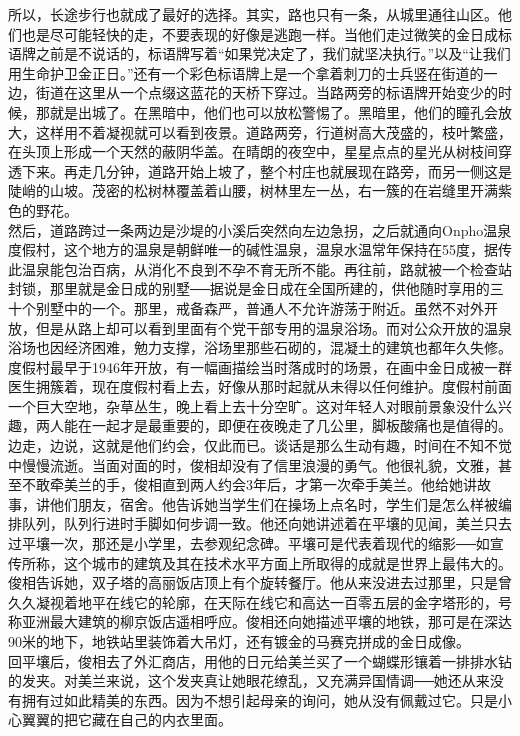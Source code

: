 所以，长途步行也就成了最好的选择。其实，路也只有一条，从城里通往山区。他们也是尽可能轻快的走，不要表现的好像是逃跑一样。当他们走过微笑的金日成标语牌之前是不说话的，标语牌写着“如果党决定了，我们就坚决执行。”以及“让我们用生命护卫金正日。”还有一个彩色标语牌上是一个拿着刺刀的士兵竖在街道的一边，街道在这里从一个点缀这蓝花的天桥下穿过。当路两旁的标语牌开始变少的时候，那就是出城了。在黑暗中，他们也可以放松警惕了。黑暗里，他们的瞳孔会放大，这样用不着凝视就可以看到夜景。道路两旁，行道树高大茂盛的，枝叶繁盛，在头顶上形成一个天然的蔽阴华盖。在晴朗的夜空中，星星点点的星光从树枝间穿透下来。再走几分钟，道路开始上坡了，整个村庄也就展现在路旁，而另一侧这是陡峭的山坡。茂密的松树林覆盖着山腰，树林里左一丛，右一簇的在岩缝里开满紫色的野花。\\

然后，道路跨过一条两边是沙堤的小溪后突然向左边急拐，之后就通向Onpho温泉度假村，这个地方的温泉是朝鲜唯一的碱性温泉，温泉水温常年保持在55度，据传此温泉能包治百病，从消化不良到不孕不育无所不能。再往前，路就被一个检查站封锁，那里就是金日成的别墅──据说是金日成在全国所建的，供他随时享用的三十个别墅中的一个。那里，戒备森严，普通人不允许游荡于附近。虽然不对外开放，但是从路上却可以看到里面有个党干部专用的温泉浴场。而对公众开放的温泉浴场也因经济困难，勉力支撑，浴场里那些石砌的，混凝土的建筑也都年久失修。度假村最早于1946年开放，有一幅画描绘当时落成时的场景，在画中金日成被一群医生拥簇着，现在度假村看上去，好像从那时起就从未得以任何维护。度假村前面一个巨大空地，杂草丛生，晚上看上去十分空旷。这对年轻人对眼前景象没什么兴趣，两人能在一起才是最重要的，即便在夜晚走了几公里，脚板酸痛也是值得的。\\

边走，边说，这就是他们约会，仅此而已。谈话是那么生动有趣，时间在不知不觉中慢慢流逝。当面对面的时，俊相却没有了信里浪漫的勇气。他很礼貌，文雅，甚至不敢牵美兰的手，俊相直到两人约会3年后，才第一次牵手美兰。他给她讲故事，讲他们朋友，宿舍。他告诉她当学生们在操场上点名时，学生们是怎么样被编排队列，队列行进时手脚如何步调一致。他还向她讲述着在平壤的见闻，美兰只去过平壤一次，那还是小学里，去参观纪念碑。平壤可是代表着现代的缩影──如宣传所称，这个城市的建筑及其在技术水平方面上所取得的成就是世界上最伟大的。俊相告诉她，双子塔的高丽饭店顶上有个旋转餐厅。他从来没进去过那里，只是曾久久凝视着地平在线它的轮廓，在天际在线它和高达一百零五层的金字塔形的，号称亚洲最大建筑的柳京饭店遥相呼应。俊相还向她描述平壤的地铁，那可是在深达90米的地下，地铁站里装饰着大吊灯，还有镀金的马赛克拼成的金日成像。\\

回平壤后，俊相去了外汇商店，用他的日元给美兰买了一个蝴蝶形镶着一排排水钻的发夹。对美兰来说，这个发夹真让她眼花缭乱，又充满异国情调──她还从来没有拥有过如此精美的东西。因为不想引起母亲的询问，她从没有佩戴过它。只是小心翼翼的把它藏在自己的内衣里面。\\

